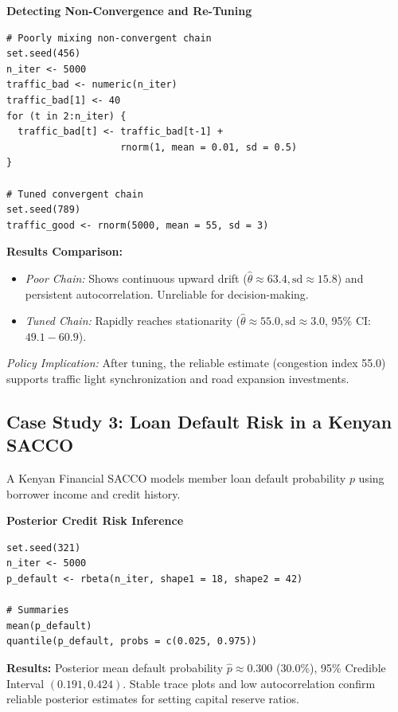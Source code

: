 \documentclass[12pt,a4paper]{article}
\begin{document}
\begin{example}
\textbf{Detecting Non-Convergence and Re-Tuning}

\begin{verbatim}
# Poorly mixing non-convergent chain
set.seed(456)
n_iter <- 5000
traffic_bad <- numeric(n_iter)
traffic_bad[1] <- 40
for (t in 2:n_iter) {
  traffic_bad[t] <- traffic_bad[t-1] + 
                    rnorm(1, mean = 0.01, sd = 0.5)
}

# Tuned convergent chain
set.seed(789)
traffic_good <- rnorm(5000, mean = 55, sd = 3)
\end{verbatim}

\textbf{Results Comparison:}
\begin{itemize}[leftmargin=1.5em]
    \item \textit{Poor Chain:} Shows continuous upward drift ($\hat{\theta} \approx 63.4, \text{sd} \approx 15.8$) and persistent autocorrelation. Unreliable for decision-making.
    \item \textit{Tuned Chain:} Rapidly reaches stationarity ($\hat{\theta} \approx 55.0, \text{sd} \approx 3.0$, 95\% CI: $49.1 - 60.9$).
\end{itemize}
\textit{Policy Implication:} After tuning, the reliable estimate (congestion index 55.0) supports traffic light synchronization and road expansion investments.
\end{example}

\subsection{Case Study 3: Loan Default Risk in a Kenyan SACCO}

A Kenyan Financial SACCO models member loan default probability $p$ using borrower income and credit history.

\begin{example}
\textbf{Posterior Credit Risk Inference}

\begin{verbatim}
set.seed(321)
n_iter <- 5000
p_default <- rbeta(n_iter, shape1 = 18, shape2 = 42)

# Summaries
mean(p_default)
quantile(p_default, probs = c(0.025, 0.975))
\end{verbatim}

\textbf{Results:} Posterior mean default probability $\hat{p} \approx 0.300$ ($30.0\%$), 95\% Credible Interval $(0.191, 0.424)$. Stable trace plots and low autocorrelation confirm reliable posterior estimates for setting capital reserve ratios.
\end{example}
\end{document}
